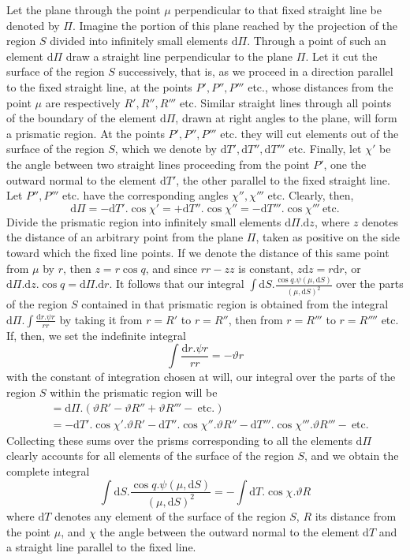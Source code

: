 Let the plane through the point $\mu$ perpendicular to that fixed straight line be denoted by $\Pi$. Imagine the portion of this plane reached by the projection of the region $S$ divided into infinitely small elements $\mathrm{d}\Pi$. Through a point of such an element $\mathrm{d}\Pi$ draw a straight line perpendicular to the plane $\Pi$. Let it cut the surface of the region $S$ successively, that is, as we proceed in a direction parallel to the fixed straight line, at the points $P',P'',P'''$ etc., whose distances from the point $\mu$ are respectively $R',R'',R'''$ etc. Similar straight lines through all points of the boundary of the element $\mathrm{d}\Pi$, drawn at right angles to the plane, will form a prismatic region. At the points $P',P'',P'''$ etc. they will cut elements out of the surface of the region $S$, which we denote by $\mathrm{d}T',\mathrm{d}T'',\mathrm{d}T'''$ etc. Finally, let $\chi'$ be the angle between two straight lines proceeding from the point $P'$, one the outward normal to the element $\mathrm{d}T'$, the other parallel to the fixed straight line. Let $P'',P'''$ etc. have the corresponding angles $\chi'',\chi'''$ etc. Clearly, then,
\[
\mathrm{d}\Pi=-\mathrm{d}T'.\cos\chi'=+\mathrm{d}T''.\cos\chi''=-\mathrm{d}T'''.\cos\chi'''\ \text{etc.}
\]
Divide the prismatic region into infinitely small elements $\mathrm{d}\Pi.\mathrm{d}z$, where $z$ denotes the distance of an arbitrary point from the plane $\Pi$, taken as positive on the side toward which the fixed line points. If we denote the distance of this same point from $\mu$ by $r$, then $z=r\cos q$, and since $rr-zz$ is constant, $z\mathrm{d}z=r\mathrm{d}r$, or $\mathrm{d}\Pi.\mathrm{d}z.\cos q=\mathrm{d}\Pi.\mathrm{d}r$. It follows that our integral $\int\mathrm{d}S.\frac{\cos q.\psi(\mu,\mathrm{d}S)}{(\mu,\mathrm{d}S)^2}$ over the parts of the region $S$ contained in that prismatic region is obtained from the integral $\mathrm{d}\Pi.\int\frac{\mathrm{d}r.\psi r}{rr}$ by taking it from $r=R'$ to $r=R''$, then from $r=R'''$ to $r=R''''$ etc. If, then, we set the indefinite integral
\[
\int\frac{\mathrm{d}r.\psi r}{rr}=-\vartheta r
\]
with the constant of integration chosen at will, our integral over the parts of the region $S$ within the prismatic region will be
\[
\begin{aligned}
&=\mathrm{d}\Pi.(\vartheta R'-\vartheta R''+\vartheta R'''-\ \text{etc.})\\
&=-\mathrm{d}T'.\cos\chi'.\vartheta R'-\mathrm{d}T''.\cos\chi''.\vartheta R''-\mathrm{d}T'''.\cos\chi'''.\vartheta R'''-\ \text{etc.}
\end{aligned}
\]
Collecting these sums over the prisms corresponding to all the elements $\mathrm{d}\Pi$ clearly accounts for all elements of the surface of the region $S$, and we obtain the complete integral
\[
\int\mathrm{d}S.\frac{\cos q.\psi(\mu,\mathrm{d}S)}{(\mu,\mathrm{d}S)^2}=-\int\mathrm{d}T.\cos\chi.\vartheta R
\]
where $\mathrm{d}T$ denotes any element of the surface of the region $S$, $R$ its distance from the point $\mu$, and $\chi$ the angle between the outward normal to the element $\mathrm{d}T$ and a straight line parallel to the fixed line.

